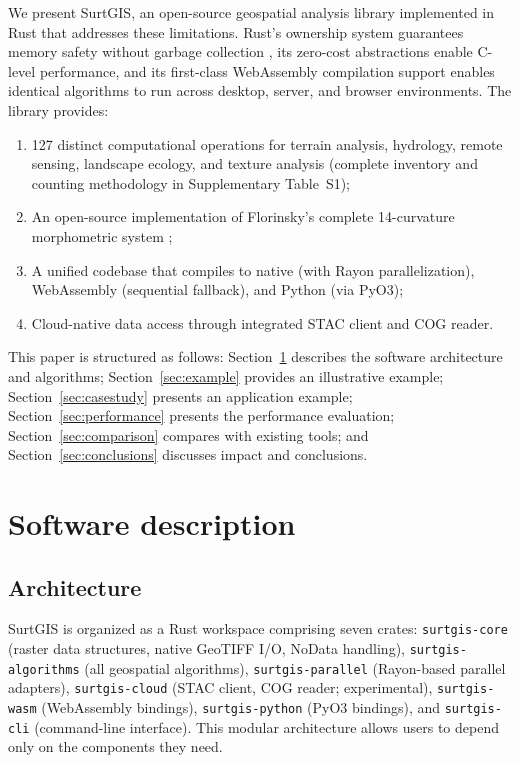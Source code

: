 \documentclass[preprint,review,12pt,authoryear]{elsarticle}
\begin{document}
We present SurtGIS, an open-source geospatial analysis library implemented in Rust that addresses these limitations. Rust's ownership system guarantees memory safety without garbage collection \citep{perkel2020rust}, its zero-cost abstractions enable C-level performance, and its first-class WebAssembly compilation support enables identical algorithms to run across desktop, server, and browser environments. The library provides:

\begin{enumerate}
    \item 127 distinct computational operations for terrain analysis, hydrology, remote sensing, landscape ecology, and texture analysis (complete inventory and counting methodology in Supplementary Table~S1);
    \item An open-source implementation of Florinsky's complete 14-curvature morphometric system \citep{florinsky2025};
    \item A unified codebase that compiles to native (with Rayon parallelization), WebAssembly (sequential fallback), and Python (via PyO3);
    \item Cloud-native data access through integrated STAC client and COG reader.
\end{enumerate}

This paper is structured as follows: Section~\ref{sec:software} describes the software architecture and algorithms; Section~\ref{sec:example} provides an illustrative example; Section~\ref{sec:casestudy} presents an application example; Section~\ref{sec:performance} presents the performance evaluation; Section~\ref{sec:comparison} compares with existing tools; and Section~\ref{sec:conclusions} discusses impact and conclusions.

\section{Software description}
\label{sec:software}

\subsection{Architecture}
\label{subsec:architecture}

SurtGIS is organized as a Rust workspace comprising seven crates: \texttt{surtgis-core} (raster data structures, native GeoTIFF I/O, NoData handling), \texttt{surtgis-algorithms} (all geospatial algorithms), \texttt{surtgis-parallel} (Rayon-based parallel adapters), \texttt{surtgis-cloud} (STAC client, COG reader; experimental), \texttt{surtgis-wasm} (WebAssembly bindings), \texttt{surtgis-python} (PyO3 bindings), and \texttt{surtgis-cli} (command-line interface). This modular architecture allows users to depend only on the components they need.
\end{document}
